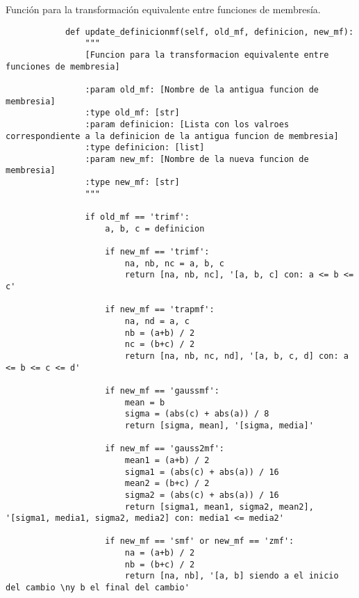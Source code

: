     \begin{longlisting}
        \caption[Transformación equivalente entre funciones de membresía]{Función para la transformación equivalente entre funciones de membresía.}
        \label{code:anexoC}				
        \begin{verbatim}
            def update_definicionmf(self, old_mf, definicion, new_mf):
                """
                [Funcion para la transformacion equivalente entre funciones de membresia]
                
                :param old_mf: [Nombre de la antigua funcion de membresia]
                :type old_mf: [str]
                :param definicion: [Lista con los valroes correspondiente a la definicion de la antigua funcion de membresia]
                :type definicion: [list]
                :param new_mf: [Nombre de la nueva funcion de membresia]
                :type new_mf: [str]
                """
                
                if old_mf == 'trimf':
                    a, b, c = definicion

                    if new_mf == 'trimf':
                        na, nb, nc = a, b, c
                        return [na, nb, nc], '[a, b, c] con: a <= b <= c'

                    if new_mf == 'trapmf':
                        na, nd = a, c
                        nb = (a+b) / 2
                        nc = (b+c) / 2
                        return [na, nb, nc, nd], '[a, b, c, d] con: a <= b <= c <= d'

                    if new_mf == 'gaussmf':
                        mean = b
                        sigma = (abs(c) + abs(a)) / 8
                        return [sigma, mean], '[sigma, media]'

                    if new_mf == 'gauss2mf':
                        mean1 = (a+b) / 2
                        sigma1 = (abs(c) + abs(a)) / 16
                        mean2 = (b+c) / 2
                        sigma2 = (abs(c) + abs(a)) / 16
                        return [sigma1, mean1, sigma2, mean2], '[sigma1, media1, sigma2, media2] con: media1 <= media2'

                    if new_mf == 'smf' or new_mf == 'zmf':
                        na = (a+b) / 2
                        nb = (b+c) / 2
                        return [na, nb], '[a, b] siendo a el inicio del cambio \ny b el final del cambio'


\end{verbatim}
\end{longlisting}
